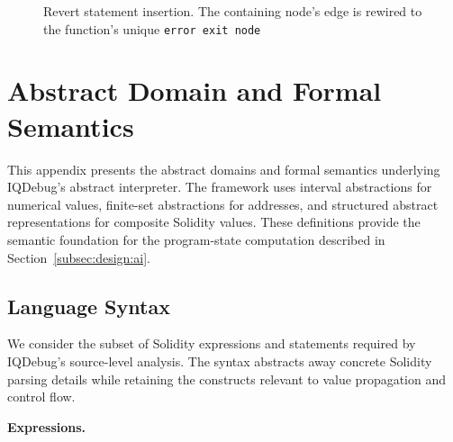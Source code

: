 \documentclass[11pt,oneside]{report}
\theoremstyle{plain}
\theoremstyle{definition}
\theoremstyle{remark}
\begin{document}
\begin{figure}[H]
\centering
{}
\caption{Revert statement insertion. The containing node's edge is rewired to the function's unique \texttt{error exit node}}
\label{fig:new-revert}
\end{figure}


\chapter{Abstract Domain and Formal Semantics}
\label{app:semantics}

This appendix presents the abstract domains and formal semantics underlying IQDebug's abstract interpreter.
The framework uses interval abstractions for numerical values, finite-set abstractions for addresses, and structured abstract representations for composite Solidity values.
These definitions provide the semantic foundation for the program-state computation described in Section~\ref{subsec:design:ai}.

\section{Language Syntax}

We consider the subset of Solidity expressions and statements required by IQDebug's source-level analysis.
The syntax abstracts away concrete Solidity parsing details while retaining the constructs relevant to value propagation and control flow.

\noindent\textbf{Expressions.}
\end{document}
